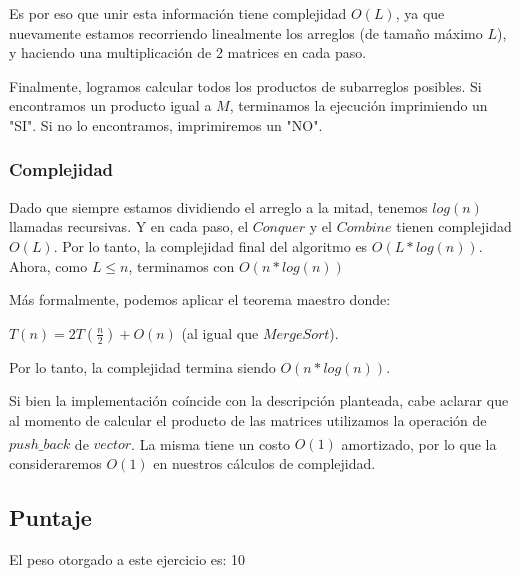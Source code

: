 Es por eso que unir esta información tiene complejidad $O(L)$, ya que nuevamente estamos recorriendo linealmente los arreglos (de tamaño máximo $L$), y haciendo una multiplicación de 2 matrices en cada paso.

Finalmente, logramos calcular todos los productos de subarreglos posibles. Si encontramos un producto igual a $M$, terminamos la ejecución imprimiendo un "SI". Si no lo encontramos, imprimiremos un "NO".
\subsubsection{Complejidad}
Dado que siempre estamos dividiendo el arreglo a la mitad, tenemos $log(n)$ llamadas recursivas. Y en cada paso, el $Conquer$ y el $Combine$ tienen complejidad $O(L)$. Por lo tanto, la complejidad final del algoritmo es $O(L * log(n))$. Ahora, como $L \leq n$, terminamos con $O(n * log(n))$

Más formalmente, podemos aplicar el teorema maestro donde:

$T(n)=2T\left({\frac {n}{2}}\right)+O(n)$	 (al igual que $Merge Sort$).

Por lo tanto, la complejidad termina siendo $O(n * log(n))$.

Si bien la implementación coíncide con la descripción planteada, cabe aclarar que al momento de calcular el producto de las matrices utilizamos la operación de $push\_back$ \textsuperscript{\cite{pushback}} de $vector$. La misma tiene un costo $O(1)$ amortizado, por lo que la consideraremos $O(1)$ en nuestros cálculos de complejidad.

\subsection{Puntaje}
El peso otorgado a este ejercicio es: 10